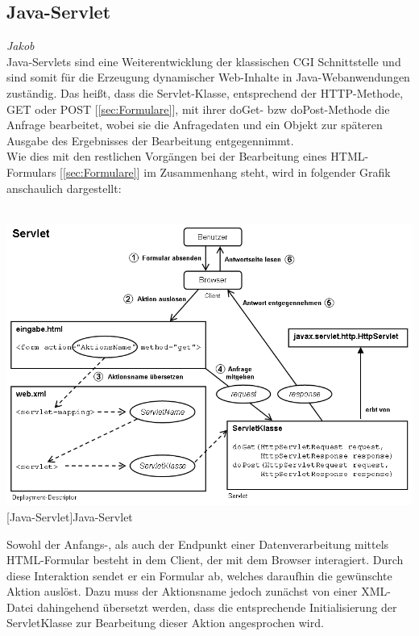 \documentclass[12pt,a4paper,bibliography=totocnumbered,listof=totocnumbered]{scrartcl}
\begin{document}
\pagebreak
\subsection{Java-Servlet}
\label{sec:Java-Servlet}
\emph{Jakob}\\
Java-Servlets sind eine Weiterentwicklung der klassischen CGI Schnittstelle und sind somit für die Erzeugung dynamischer Web-Inhalte in Java-Webanwendungen zuständig.
Das heißt, dass die Servlet-Klasse, entsprechend der HTTP-Methode, GET oder POST [\ref{sec:Formulare}], mit ihrer doGet- bzw doPost-Methode die Anfrage bearbeitet, wobei sie die Anfragedaten und ein Objekt zur späteren Ausgabe des Ergebnisses der Bearbeitung entgegennimmt.\cite{wiki/Servlet}\\
Wie dies mit den restlichen Vorgängen bei der Bearbeitung eines HTML-Formulars [\ref{sec:Formulare}] im Zusammenhang steht, wird in folgender Grafik anschaulich dargestellt:\\
\\
\vspace{1em}
\begin{minipage}{\linewidth}
	\centering
	\includegraphics[width=0.9\linewidth]{Bilder/600px-Servlet.png}
	[Java-Servlet]{Java-Servlet\footnotemark }
	\label{fig:servlet}
\end{minipage}

Sowohl der Anfangs-, als auch der Endpunkt einer Datenverarbeitung mittels HTML-Formular besteht in dem Client, der mit dem Browser interagiert. Durch diese Interaktion sendet er ein Formular ab, welches daraufhin die gewünschte Aktion auslöst. Dazu muss der Aktionsname jedoch zunächst von einer XML-Datei dahingehend übersetzt werden, dass die entsprechende Initialisierung der ServletKlasse zur Bearbeitung dieser Aktion angesprochen wird. \pagebreak
\end{document}
